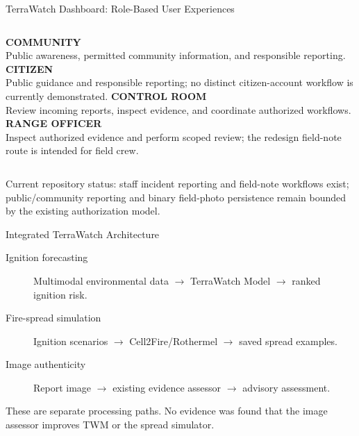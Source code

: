 \documentclass[aspectratio=169,10pt]{beamer}
\begin{document}
\begin{frame}{TerraWatch Dashboard: Role-Based User Experiences}
  \begin{columns}[T]
    \textbf{COMMUNITY}\\[.4em]Public awareness, permitted community information, and responsible reporting.
    \textbf{CITIZEN}\\[.4em]Public guidance and responsible reporting; no distinct citizen-account workflow is currently demonstrated.
    \textbf{CONTROL ROOM}\\[.4em]Review incoming reports, inspect evidence, and coordinate authorized workflows.
    \textbf{RANGE OFFICER}\\[.4em]Inspect authorized evidence and perform scoped review; the redesign field-note route is intended for field crew.
  \end{columns}
  \vfill
  \small Current repository status: staff incident reporting and field-note workflows exist; public/community reporting and binary field-photo persistence remain bounded by the existing authorization model.
\end{frame}

\begin{frame}{Integrated TerraWatch Architecture}
  \begin{description}
    \item[Ignition forecasting] Multimodal environmental data $\rightarrow$ TerraWatch Model $\rightarrow$ ranked ignition risk.
    \item[Fire-spread simulation] Ignition scenarios $\rightarrow$ Cell2Fire/Rothermel $\rightarrow$ saved spread examples.
    \item[Image authenticity] Report image $\rightarrow$ existing evidence assessor $\rightarrow$ advisory assessment.
  \end{description}
  \vfill
  \small These are separate processing paths. No evidence was found that the image assessor improves TWM or the spread simulator.
\end{frame}
\end{document}
